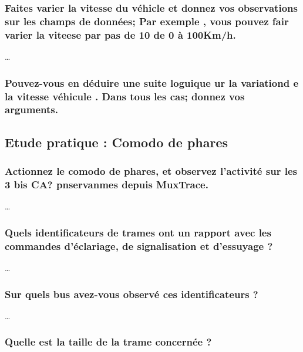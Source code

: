 \documentclass{rapportECC}
\begin{document}
\subsubsection*{Faites varier la vitesse du véhicle et donnez vos observations sur les champs de données; Par exemple , vous pouvez fair varier la viteese par pas de 10 de 0 à 100Km/h.}

\dots

\subsubsection*{Pouvez-vous en déduire une suite loguique ur la variationd e la vitesse véhicule . Dans tous les cas; donnez vos arguments.}

\subsection{Etude pratique : Comodo de phares}

\subsubsection*{Actionnez le comodo de phares, et observez l'activité sur les 3 bis CA? pnservanmes depuis MuxTrace.}

\dots

\subsubsection*{Quels identificateurs de trames ont un rapport avec les commandes d'éclariage, de signalisation et d'essuyage ?}

\dots

\subsubsection*{Sur quels bus avez-vous observé ces identificateurs ?}

\dots

\subsubsection*{Quelle est la taille de la trame concernée ?}
\end{document}
